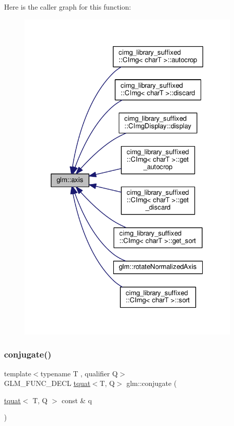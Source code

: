 Here is the caller graph for this function\+:
\nopagebreak
\begin{figure}[H]
\begin{center}
\leavevmode
\includegraphics[width=305pt]{d5/d66/group__gtc__quaternion_gaaf2707d3081789ce097daaa6e54d5287_icgraph}
\end{center}
\end{figure}
\mbox{\label{group__gtc__quaternion_gac40833db608deda477f018767b9a1cad}} 
\subsubsection{\texorpdfstring{conjugate()}{conjugate()}}
{\footnotesize\ttfamily template$<$typename T , qualifier Q$>$ \\
G\+L\+M\+\_\+\+F\+U\+N\+C\+\_\+\+D\+E\+CL \hyperlink{structglm_1_1tquat}{tquat}$<$T, Q$>$ glm\+::conjugate (\begin{DoxyParamCaption}\item[{\hyperlink{structglm_1_1tquat}{tquat}$<$ T, Q $>$ const \&}]{q }\end{DoxyParamCaption})}




